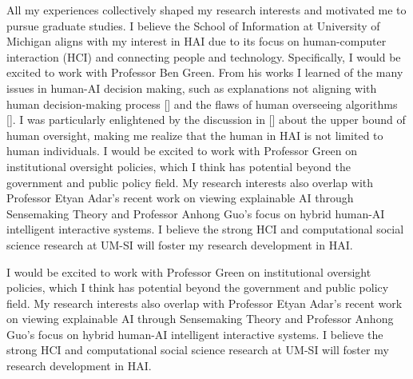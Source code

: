 





All my experiences collectively shaped my research interests and motivated
me to pursue graduate studies. 
I believe the School of Information at University of Michigan aligns with my interest in HAI due to its focus on human-computer interaction (HCI) and connecting people and technology.
Specifically, I would be excited to work with Professor Ben Green. 
From his works I learned of the many issues in human-AI decision making, such as explanations not aligning with human decision-making process [] and the flaws of human overseeing algorithms []. 
I was particularly enlightened by the discussion in [] about the upper bound of human oversight, making me realize that the human in HAI is not limited to human individuals. 
I would be excited to work with Professor Green on institutional oversight policies, which I think has potential beyond the government and public policy field. 
My research interests also overlap with Professor Etyan Adar's recent work on viewing explainable AI through Sensemaking Theory and Professor Anhong Guo's focus on hybrid human-AI intelligent interactive systems. 
I believe the strong HCI and computational social science research at UM-SI will foster my research development in HAI.



I would be excited to work with Professor Green on institutional oversight policies, which I think has potential beyond the government and public policy field. 
My research interests also overlap with Professor Etyan Adar's recent work on viewing explainable AI through Sensemaking Theory and Professor Anhong Guo's focus on hybrid human-AI intelligent interactive systems. 
I believe the strong HCI and computational social science research at UM-SI will foster my research development in HAI.